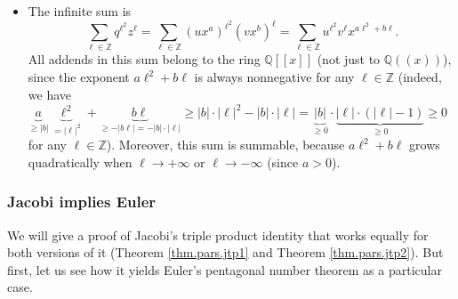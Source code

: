\begin{itemize}
\item The infinite sum is%
\[
\sum_{\ell\in\mathbb{Z}}q^{\ell^{2}}z^{\ell}=\sum_{\ell\in\mathbb{Z}}\left(
ux^{a}\right)  ^{\ell^{2}}\left(  vx^{b}\right)  ^{\ell}=\sum_{\ell
\in\mathbb{Z}}u^{\ell^{2}}v^{\ell}x^{a\ell^{2}+b\ell}.
\]
All addends in this sum belong to the ring $\mathbb{Q}\left[  \left[
x\right]  \right]  $ (not just to $\mathbb{Q}\left(  \left(  x\right)
\right)  $), since the exponent $a\ell^{2}+b\ell$ is always nonnegative for
any $\ell\in\mathbb{Z}$ (indeed, we have $\underbrace{a}_{\geq\left\vert
b\right\vert }\underbrace{\ell^{2}}_{=\left\vert \ell\right\vert ^{2}%
}+\underbrace{b\ell}_{\geq-\left\vert b\ell\right\vert =-\left\vert
b\right\vert \cdot\left\vert \ell\right\vert }\geq\left\vert b\right\vert
\cdot\left\vert \ell\right\vert ^{2}-\left\vert b\right\vert \cdot\left\vert
\ell\right\vert =\underbrace{\left\vert b\right\vert }_{\geq0}\cdot
\underbrace{\left\vert \ell\right\vert \cdot\left(  \left\vert \ell\right\vert
-1\right)  }_{\geq0}\geq0$ for any $\ell\in\mathbb{Z}$). Moreover, this sum is
summable, because $a\ell^{2}+b\ell$ grows quadratically when $\ell
\rightarrow+\infty$ or $\ell\rightarrow-\infty$ (since $a>0$).
\end{itemize}

\subsubsection{Jacobi implies Euler}

We will give a proof of Jacobi's triple product identity that works equally
for both versions of it (Theorem \ref{thm.pars.jtp1} and Theorem
\ref{thm.pars.jtp2}). But first, let us see how it yields Euler's pentagonal
number theorem as a particular case.


